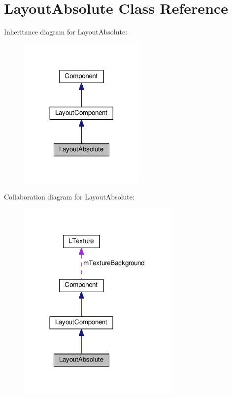 \hypertarget{class_layout_absolute}{}\section{Layout\+Absolute Class Reference}
\label{class_layout_absolute}


Inheritance diagram for Layout\+Absolute\+:\nopagebreak
\begin{figure}[H]
\begin{center}
\leavevmode
\includegraphics[width=176pt]{class_layout_absolute__inherit__graph}
\end{center}
\end{figure}


Collaboration diagram for Layout\+Absolute\+:\nopagebreak
\begin{figure}[H]
\begin{center}
\leavevmode
\includegraphics[width=225pt]{class_layout_absolute__coll__graph}
\end{center}
\end{figure}
